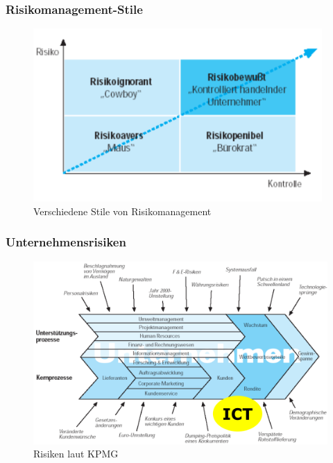 \documentclass[10pt,a4paper]{article}
\begin{document}
\subsubsection*{Risikomanagement-Stile}
\begin{figure}[H]
    \begin{center}
    \includegraphics[width=11cm]{images/KPMG_Risikomanagementstile.png}
    \caption{Verschiedene Stile von Risikomanagement}
    \label{risikomanagementstile}
    \end{center}
\end{figure}

\subsubsection*{Unternehmensrisiken}
\begin{figure}[H]
    \begin{center}
    \includegraphics[width=13cm]{images/KPMG_Risiken.png}
    \caption{Risiken laut KPMG}
    \label{KPMG Unternehmensrisiken}
    \end{center}
\end{figure}
\end{document}
